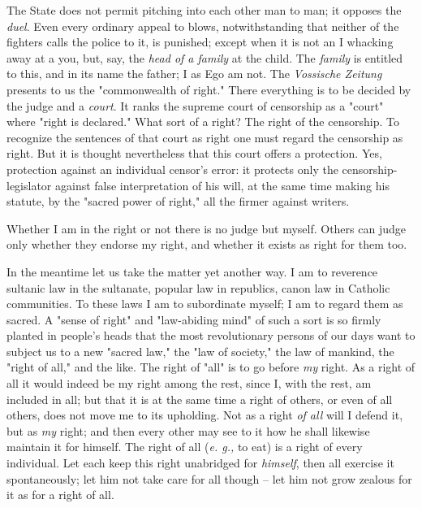 The State does not permit pitching into each other man to man; it opposes the 
\textit{duel}. Even every ordinary appeal to blows, notwithstanding that 
neither of the fighters calls the police to it, is punished; except when it is 
not an I whacking away at a you, but, say, the \textit{head of a family} at 
the child. The \textit{family} is entitled to this, and in its name the 
father; I as Ego am not. The \textit{Vossische Zeitung} presents to us the 
"{}commonwealth of right."{} There everything is to be decided by the judge 
and a \textit{court}. It ranks the supreme court of censorship as a 
"{}court"{} where "{}right is declared."{} What sort of a right? The right of 
the censorship. To recognize the sentences of that court as right one must 
regard the censorship as right. But it is thought nevertheless that this court 
offers a protection. Yes, protection against an individual censor's error: it 
protects only the censorship-legislator against false interpretation of his 
will, at the same time making his statute, by the "{}sacred power of right,"{} 
all the firmer against writers.

Whether I am in the right or not there is no judge but myself. Others can 
judge only whether they endorse my right, and whether it exists as right for 
them too.

In the meantime let us take the matter yet another way. I am to reverence 
sultanic law in the sultanate, popular law in republics, canon law in Catholic 
communities. To these laws I am to subordinate myself; I am to regard them as 
sacred. A "{}sense of right"{} and "{}law-abiding mind"{} of such a sort is so 
firmly planted in people's heads that the most revolutionary persons of our 
days want to subject us to a new "{}sacred law,"{} the "{}law of society,"{} 
the law of mankind, the "{}right of all,"{} and the like. The right of 
"{}all"{} is to go before \textit{my} right. As a right of all it would indeed 
be my right among the rest, since I, with the rest, am included in all; but 
that it is at the same time a right of others, or even of all others, does not 
move me to its upholding. Not as a right \textit{of all} will I defend it, but 
as \textit{my} right; and then every other may see to it how he shall likewise 
maintain it for himself. The right of all (\textit{e. g.,} to eat) is a right 
of every individual. Let each keep this right unabridged for \textit{himself}, 
then all exercise it spontaneously; let him not take care for all though -- 
let him not grow zealous for it as for a right of all.

